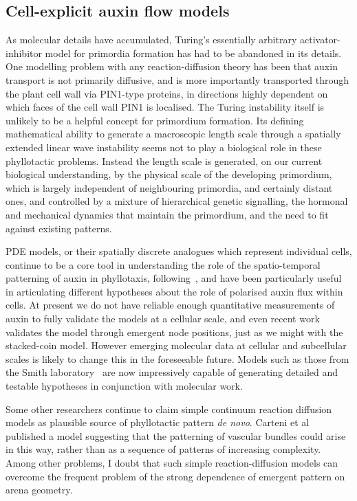 \subsection{Cell-explicit auxin flow models}

As molecular details have accumulated, Turing's essentially arbitrary activator-inhibitor  model for primordia formation has had to be abandoned in its details.  One modelling problem with any reaction-diffusion theory has been that auxin transport is not primarily diffusive, and is more importantly transported through the plant cell wall via PIN1-type proteins, in directions highly dependent on which faces of the cell wall PIN1 is localised. 
The Turing instability itself  is unlikely to be a helpful concept for primordium formation. Its defining mathematical ability to generate a macroscopic length scale through a spatially extended linear wave instability seems not to play a biological role in these phyllotactic problems. Instead the length scale is generated, on our current biological understanding, by the physical scale of the developing primordium, which is largely independent of neighbouring primordia, and certainly distant ones, and controlled by a mixture of hierarchical genetic signalling,  the hormonal and mechanical dynamics that maintain the primordium, and the need to fit against existing patterns. 

PDE models, or their spatially discrete analogues which represent individual cells, continue to be a core tool in understanding the role of the spatio-temporal patterning of auxin in phyllotaxis, following~\cite{reinhardtRegulationPhyllotaxisPolar2003,smithPlausibleModelPhyllotaxis2006,jonssonAuxindrivenPolarizedTransport2006}, and have been particularly useful in articulating different hypotheses about the role of polarised auxin flux  within cells.
 At present we do not have reliable enough quantitative measurements of auxin to fully validate the models at a cellular scale, and 
 even recent work~\cite{pennybackerPhyllotaxisProgressStory2015} validates the model through emergent node positions, just as we might with the stacked-coin model. However emerging molecular data at cellular and subcellular scales is likely to change this in the foreseeable future. Models such as those from the Smith laboratory~\cite{martinezLeftRightLeaf2016,chitwoodLeafAsymmetryDevelopmental2012} are now impressively capable of generating detailed and testable hypotheses in conjunction with molecular work. 
 
Some other researchers continue to claim simple continuum reaction diffusion models as plausible source of phyllotactic pattern \textit{de novo}. Carteni et al~\autocite{carteniModellingDevelopmentArrangement2014} published a model suggesting that the patterning of vascular bundles could arise in this way, rather than as a sequence of patterns of increasing complexity. Among other problems, I doubt that such simple reaction-diffusion models can overcome the frequent problem of the strong dependence of emergent pattern on arena geometry. 


